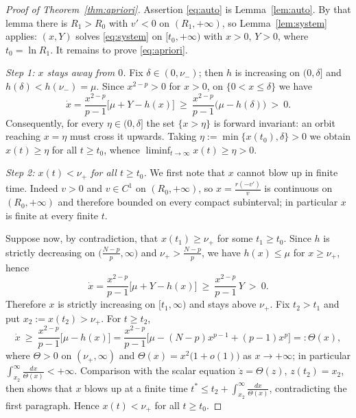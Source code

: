 \documentclass[10pt,a4paper]{amsart}
\begin{document}
\begin{proof}[Proof of Theorem~\ref{thm:apriori}]
Assertion \eqref{eq:auto} is Lemma~\ref{lem:auto}. By that lemma there is
$R_{1}>R_{0}$ with $v'<0$ on $(R_{1},+\infty)$, so Lemma~\ref{lem:system}
applies: $(x,Y)$ solves \eqref{eq:system} on $[t_{0},+\infty)$ with $x>0$,
$Y>0$, where $t_{0}=\ln R_{1}$. It remains to prove \eqref{eq:apriori}.

\smallskip
\noindent\emph{Step 1: $x$ stays away from $0$.} Fix $\delta\in(0,\nu_{-})$;
then $h$ is increasing on $(0,\delta]$ and $h(\delta)<h(\nu_{-})=\mu$. Since
$x^{2-p}>0$ for $x>0$, on $\{0<x\le\delta\}$ we have
\[
\dot x=\frac{x^{2-p}}{p-1}\big[\mu+Y-h(x)\big]
\ \ge\ \frac{x^{2-p}}{p-1}\big(\mu-h(\delta)\big)\ >\ 0 .
\]
Consequently, for every $\eta\in(0,\delta]$ the set $\{x>\eta\}$ is forward
invariant: an orbit reaching $x=\eta$ must cross it upwards. Taking
$\eta:=\min\{x(t_{0}),\delta\}>0$ we obtain $x(t)\ge\eta$ for all $t\ge t_{0}$,
whence $\liminf_{t\to\infty}x(t)\ge\eta>0$.

\smallskip
\noindent\emph{Step 2: $x(t)<\nu_{+}$ for all $t\ge t_{0}$.} We first note that
$x$ cannot blow up in finite time. Indeed $v>0$ and $v\in C^{1}$ on
$(R_{0},+\infty)$, so $x=\frac{r(-v')}{v}$ is continuous on
$(R_{0},+\infty)$ and therefore bounded on every compact subinterval; in
particular $x$ is finite at every finite $t$.

Suppose now, by contradiction, that $x(t_{1})\ge\nu_{+}$ for some
$t_{1}\ge t_{0}$. Since $h$ is strictly decreasing on
$\big(\frac{N-p}{p},\infty\big)$ and $\nu_{+}>\frac{N-p}{p}$, we have
$h(x)\le\mu$ for $x\ge\nu_{+}$, hence
\[
\dot x=\frac{x^{2-p}}{p-1}\big[\mu+Y-h(x)\big]
\ \ge\ \frac{x^{2-p}}{p-1}\,Y\ >\ 0 .
\]
Therefore $x$ is strictly increasing on $[t_{1},\infty)$ and stays above
$\nu_{+}$. Fix $t_{2}>t_{1}$ and put $x_{2}:=x(t_{2})>\nu_{+}$. For
$t\ge t_{2}$,
\[
\dot x\ \ge\ \frac{x^{2-p}}{p-1}\big[\mu-h(x)\big]
=\frac{x^{2-p}}{p-1}\Big[\mu-(N-p)x^{p-1}+(p-1)x^{p}\Big]=:\Theta(x) ,
\]
where $\Theta>0$ on $(\nu_{+},\infty)$ and $\Theta(x)=x^{2}\big(1+o(1)\big)$ as
$x\to+\infty$; in particular
$\int_{x_{2}}^{\infty}\frac{dx}{\Theta(x)}<+\infty$. Comparison with the
scalar equation $\dot z=\Theta(z)$, $z(t_{2})=x_{2}$, then shows that $x$
blows up at a finite time
$t^{*}\le t_{2}+\int_{x_{2}}^{\infty}\frac{dx}{\Theta(x)}$, contradicting the
first paragraph. Hence $x(t)<\nu_{+}$ for all $t\ge t_{0}$.


\end{proof}
\end{document}
